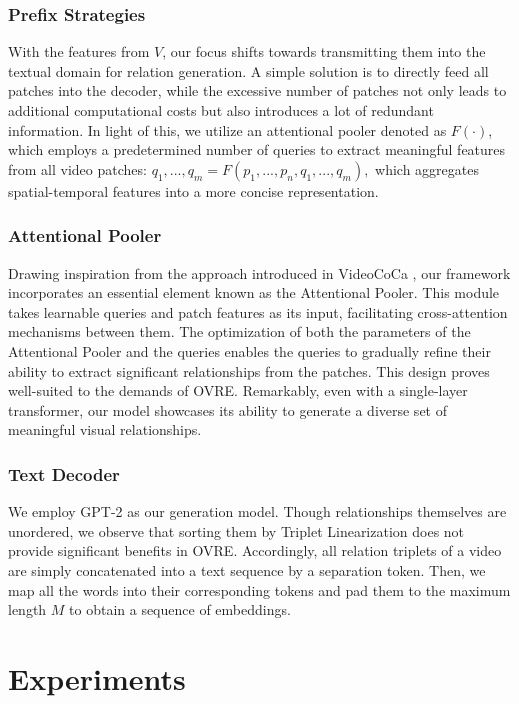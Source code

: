 \documentclass[letterpaper]{article}
\begin{document}
\subsubsection{Prefix Strategies}
With the features from $V$, our focus shifts towards transmitting them into the textual domain for relation generation. A simple solution is to directly feed all patches into the decoder, while the excessive number of patches not only leads to additional computational costs but also introduces a lot of redundant information.
In light of this, we utilize an attentional pooler denoted as $F(\cdot)$, which employs a predetermined number of queries to extract meaningful features from all video patches:
$
q_1,...,q_m=F(p_1,...,p_n,q_1,...,q_m),
$
which aggregates spatial-temporal features into a more concise representation.
\subsubsection{Attentional Pooler}
Drawing inspiration from the approach introduced in VideoCoCa \cite{yan2023videococa},
our framework incorporates an essential element known as the Attentional Pooler. This module takes learnable queries and patch features as its input, facilitating cross-attention mechanisms between them.
The optimization of both the parameters of the Attentional Pooler and the queries enables the queries to gradually refine their ability to extract significant relationships from the patches. This design proves well-suited to the demands of OVRE. Remarkably, even with a single-layer transformer, our model showcases its ability to generate a diverse set of meaningful visual relationships.



\subsubsection{Text Decoder}
We employ GPT-2 \cite{radford2019language} as our generation model.
Though relationships themselves are unordered, we observe that sorting them by Triplet Linearization \cite{cabot2021rebel} does not provide significant benefits in OVRE.
Accordingly, all relation triplets of a video are simply concatenated into a text sequence by a separation token.
Then, we map all the words into their corresponding tokens and pad them to the maximum length $M$ to obtain a sequence of embeddings.

\section{Experiments}
\end{document}
